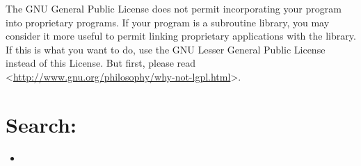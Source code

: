 \documentclass[letterpaper,10pt,english]{sphinxmanual}
\begin{document}
The GNU General Public License does not permit incorporating your program
into proprietary programs.  If your program is a subroutine library, you
may consider it more useful to permit linking proprietary applications with
the library.  If this is what you want to do, use the GNU Lesser General
Public License instead of this License.  But first, please read
\textless{}\url{http://www.gnu.org/philosophy/why-not-lgpl.html}\textgreater{}.


\chapter{Search:}
\label{index:search}\begin{itemize}
\item {} 

\end{itemize}



\renewcommand{\indexname}{Index}
\printindex
\end{document}

